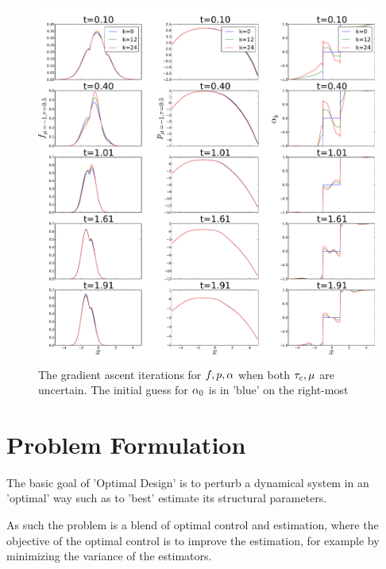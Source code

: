 \begin{figure}[htp]
\begin{center}
  \includegraphics[width=1\textwidth]{Figs/OUFBSolver_BetaMu/FB_alpha_iterates_uICs_5_Tf=2.pdf}
  \caption[tableofCs]{The gradient ascent iterations for $f,p,\alpha$ when both
  ${ \tau_{c} }, {\mu }$ are uncertain. The initial guess for $\alpha_0$ is in 'blue' on the
  right-most }
  \label{fig:fpalpha_iterates_mubeta}
\end{center}
\end{figure}






\section{Problem Formulation}
The basic goal of 'Optimal Design' is to perturb a dynamical system in an
'optimal' way such as to 'best' estimate its structural parameters. 

As such the problem is a blend of optimal control and estimation, where the
objective of the optimal control is to improve the estimation, for example by
minimizing the variance of the estimators. 

